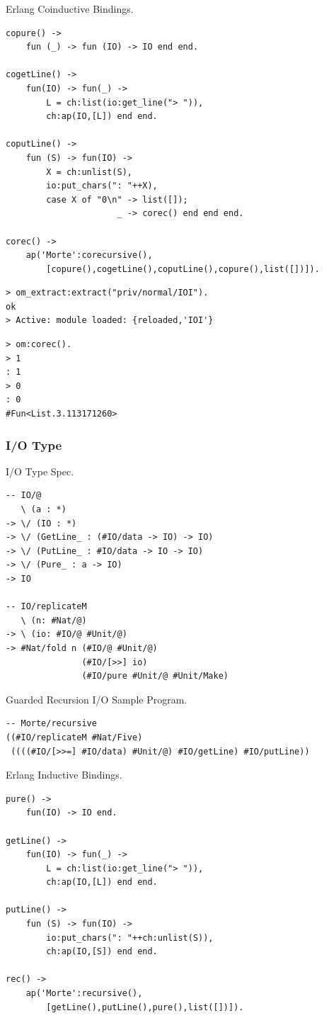 \documentclass[11pt,oneside]{article}
\begin{document}
Erlang Coinductive Bindings.

\begin{lstlisting}[mathescape=true]
copure() ->
    fun (_) -> fun (IO) -> IO end end.

cogetLine() ->
    fun(IO) -> fun(_) ->
        L = ch:list(io:get_line("> ")),
        ch:ap(IO,[L]) end end.

coputLine() ->
    fun (S) -> fun(IO) ->
        X = ch:unlist(S),
        io:put_chars(": "++X),
        case X of "0\n" -> list([]);
                      _ -> corec() end end end.

corec() ->
    ap('Morte':corecursive(),
        [copure(),cogetLine(),coputLine(),copure(),list([])]).
\end{lstlisting}

\begin{lstlisting}[mathescape=true]
> om_extract:extract("priv/normal/IOI").
ok
> Active: module loaded: {reloaded,'IOI'}
\end{lstlisting}

\begin{lstlisting}[mathescape=true]
> om:corec().
> 1
: 1
> 0
: 0
#Fun<List.3.113171260>
\end{lstlisting}

\newpage

\subsubsection{I/O Type}

I/O Type Spec.

\begin{lstlisting}[mathescape=true]
-- IO/@
   \ (a : *)
-> \/ (IO : *)
-> \/ (GetLine_ : (#IO/data -> IO) -> IO)
-> \/ (PutLine_ : #IO/data -> IO -> IO)
-> \/ (Pure_ : a -> IO)
-> IO

-- IO/replicateM
   \ (n: #Nat/@)
-> \ (io: #IO/@ #Unit/@)
-> #Nat/fold n (#IO/@ #Unit/@)
               (#IO/[>>] io)
               (#IO/pure #Unit/@ #Unit/Make)
\end{lstlisting}

Guarded Recursion I/O Sample Program.

\begin{lstlisting}[mathescape=true]
-- Morte/recursive
((#IO/replicateM #Nat/Five)
 ((((#IO/[>>=] #IO/data) #Unit/@) #IO/getLine) #IO/putLine))
\end{lstlisting}

Erlang Inductive Bindings.

\begin{lstlisting}[mathescape=true]
pure() ->
    fun(IO) -> IO end.

getLine() ->
    fun(IO) -> fun(_) ->
        L = ch:list(io:get_line("> ")),
        ch:ap(IO,[L]) end end.

putLine() ->
    fun (S) -> fun(IO) ->
        io:put_chars(": "++ch:unlist(S)),
        ch:ap(IO,[S]) end end.

rec() ->
    ap('Morte':recursive(),
        [getLine(),putLine(),pure(),list([])]).
\end{lstlisting}
\end{document}
